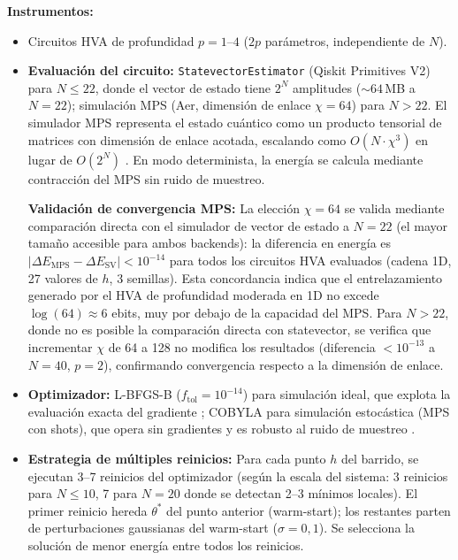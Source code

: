 \documentclass[11pt,a4paper,spanish]{book}
\begin{document}
\textbf{Instrumentos:}
\begin{itemize}
    \item Circuitos HVA de profundidad $p = 1$--$4$ ($2p$ parámetros, independiente de $N$).

    \item \textbf{Evaluación del circuito:} \texttt{StatevectorEstimator} (Qiskit Primitives V2) para $N \leq 22$, donde el vector de estado tiene $2^N$ amplitudes ($\sim 64$\,MB a $N = 22$); simulación MPS (Aer, dimensión de enlace $\chi = 64$) para $N > 22$. El simulador MPS representa el estado cuántico como un producto tensorial de matrices con dimensión de enlace acotada, escalando como $O(N \cdot \chi^3)$ en lugar de $O(2^N)$ \citep{hauschild2018}. En modo determinista, la energía se calcula mediante contracción del MPS sin ruido de muestreo.

    \textbf{Validación de convergencia MPS:} La elección $\chi = 64$ se valida mediante comparación directa con el simulador de vector de estado a $N = 22$ (el mayor tamaño accesible para ambos backends): la diferencia en energía es $|\Delta E_{\text{MPS}} - \Delta E_{\text{SV}}| < 10^{-14}$ para todos los circuitos HVA evaluados (cadena 1D, 27 valores de $h$, 3 semillas). Esta concordancia indica que el entrelazamiento generado por el HVA de profundidad moderada en 1D no excede $\log(64) \approx 6$ ebits, muy por debajo de la capacidad del MPS. Para $N > 22$, donde no es posible la comparación directa con statevector, se verifica que incrementar $\chi$ de 64 a 128 no modifica los resultados (diferencia $< 10^{-13}$ a $N = 40$, $p = 2$), confirmando convergencia respecto a la dimensión de enlace.

    \item \textbf{Optimizador:} L-BFGS-B ($f_{\text{tol}} = 10^{-14}$) para simulación ideal, que explota la evaluación exacta del gradiente \citep{tilly2022}; COBYLA para simulación estocástica (MPS con shots), que opera sin gradientes y es robusto al ruido de muestreo \citep{singh2025}.

    \item \textbf{Estrategia de múltiples reinicios:} Para cada punto $h$ del barrido, se ejecutan 3--7 reinicios del optimizador (según la escala del sistema: 3 reinicios para $N \leq 10$, 7 para $N = 20$ donde se detectan 2--3 mínimos locales). El primer reinicio hereda $\theta^*$ del punto anterior (warm-start); los restantes parten de perturbaciones gaussianas del warm-start ($\sigma = 0,1$). Se selecciona la solución de menor energía entre todos los reinicios.
\end{itemize}
\end{document}
